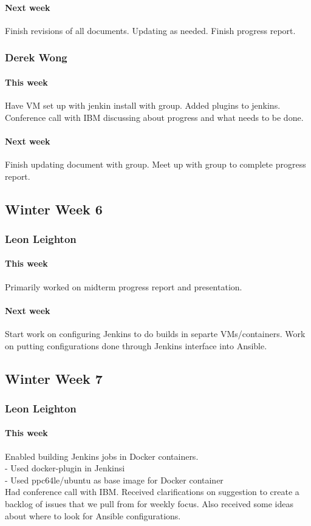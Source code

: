 \documentclass[10pt,letterpaper,onecolumn,draftclsnofoot]{IEEEtran}
\begin{document}
\paragraph{Next week}Finish revisions of all documents. Updating as needed.  
Finish progress report.

\subsubsection{Derek Wong}
\paragraph{This week}Have VM set up with jenkin install with group.       
Added plugins to jenkins.      
Conference call with IBM discussing about progress and what needs to be done. 
\paragraph{Next week}Finish updating document with group.       
Meet up with group to complete progress report.


\subsection{Winter Week 6}
\subsubsection{Leon Leighton}
\paragraph{This week}Primarily worked on midterm progress report and presentation.
\paragraph{Next week}Start work on configuring Jenkins to do builds in separte VMs/containers.  
Work on putting configurations done through Jenkins interface into Ansible.


\subsection{Winter Week 7}
\subsubsection{Leon Leighton}
\paragraph{This week}Enabled building Jenkins jobs in Docker containers.\\
- Used docker-plugin in Jenkinsi\\
- Used ppc64le/ubuntu as base image for Docker container \\ 
Had conference call with IBM. Received clarifications on suggestion to create a backlog of issues that we pull from for weekly focus. Also received some ideas about where to look for Ansible configurations.  
\end{document}
